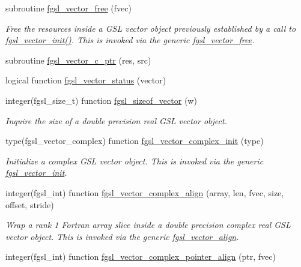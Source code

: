 \begin{DoxyCompactItemize}
subroutine \hyperlink{array_8finc_a900770fc4f4831abf928959477ba663f}{fgsl\-\_\-vector\-\_\-free} (fvec)
\begin{DoxyCompactList}\small\item\em Free the resources inside a G\-S\-L vector object previously established by a call to \hyperlink{array_8finc_a0b6fe341146fbb3dfb27386e73c5d042}{fgsl\-\_\-vector\-\_\-init()}. This is invoked via the generic \hyperlink{interfacefgsl__vector__free}{fgsl\-\_\-vector\-\_\-free}. \end{DoxyCompactList}\item 
subroutine \hyperlink{array_8finc_a8e80ad86d191ff87ae459b78822d468d}{fgsl\-\_\-vector\-\_\-c\-\_\-ptr} (res, src)
\item 
logical function \hyperlink{array_8finc_a804073922a322c29cd5be43410581ba4}{fgsl\-\_\-vector\-\_\-status} (vector)
\item 
integer(fgsl\-\_\-size\-\_\-t) function \hyperlink{array_8finc_a35a09f656acc547c7613501889490fc0}{fgsl\-\_\-sizeof\-\_\-vector} (w)
\begin{DoxyCompactList}\small\item\em Inquire the size of a double precision real G\-S\-L vector object. \end{DoxyCompactList}\item 
type(fgsl\-\_\-vector\-\_\-complex) function \hyperlink{array_8finc_a71c83c0b1de4b3965b6b8d6efb28cf13}{fgsl\-\_\-vector\-\_\-complex\-\_\-init} (type)
\begin{DoxyCompactList}\small\item\em Initialize a complex G\-S\-L vector object. This is invoked via the generic \hyperlink{interfacefgsl__vector__init}{fgsl\-\_\-vector\-\_\-init}. \end{DoxyCompactList}\item 
integer(fgsl\-\_\-int) function \hyperlink{array_8finc_ad91319661b892e978cfc3da52b15b500}{fgsl\-\_\-vector\-\_\-complex\-\_\-align} (array, len, fvec, size, offset, stride)
\begin{DoxyCompactList}\small\item\em Wrap a rank 1 Fortran array slice inside a double precision complex real G\-S\-L vector object. This is invoked via the generic \hyperlink{interfacefgsl__vector__align}{fgsl\-\_\-vector\-\_\-align}. \end{DoxyCompactList}\item 
integer(fgsl\-\_\-int) function \hyperlink{array_8finc_a0299f0feb175c085408bffdc001cb680}{fgsl\-\_\-vector\-\_\-complex\-\_\-pointer\-\_\-align} (ptr, fvec)

\end{DoxyCompactItemize}
